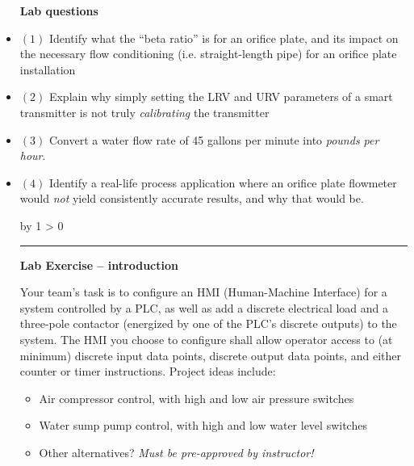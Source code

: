 \documentclass[12pt,a4paper]{article}
\def\oppgave{
            \advance\questnum by 1
            \ifnum \questnum > 0
                 \hrule
                 \vskip 3pt
                 \leftline{Oppgave \the\questnum}
                 \vskip 3pt \fi}
\begin{document}
\begin{itemize}
\vfil \eject

\noindent
{\bf Lab questions}

\vskip 20pt

\item{$(1)$} Identify what the ``beta ratio'' is for an orifice plate, and its impact on the necessary flow conditioning (i.e. straight-length pipe) for an orifice plate installation

\vskip 20pt

\item{$(2)$} Explain why simply setting the LRV and URV parameters of a smart transmitter is not truly {\it calibrating} the transmitter

\vskip 20pt

\item{$(3)$} Convert a water flow rate of 45 gallons per minute into {\it pounds per hour}.

\vskip 20pt

\item{$(4)$} Identify a real-life process application where an orifice plate flowmeter would {\it not} yield consistently accurate results, and why that would be.
 



\vfil \eject 




\oppgave{} 

\noindent
{\bf Lab Exercise -- introduction}

\vskip 5pt

Your team's task is to configure an HMI (Human-Machine Interface) for a system controlled by a PLC, as well as add a discrete electrical load and a three-pole contactor (energized by one of the PLC's discrete outputs) to the system.  The HMI you choose to configure shall allow operator access to (at minimum) discrete input data points, discrete output data points, and either counter or timer instructions.  Project ideas include:

\begin{itemize}
\item{} Air compressor control, with high and low air pressure switches
\vskip 5pt
\item{} Water sump pump control, with high and low water level switches
\vskip 5pt
\item{} Other alternatives? {\it Must be pre-approved by instructor!}
\end{itemize}


\end{itemize}
\end{document}
